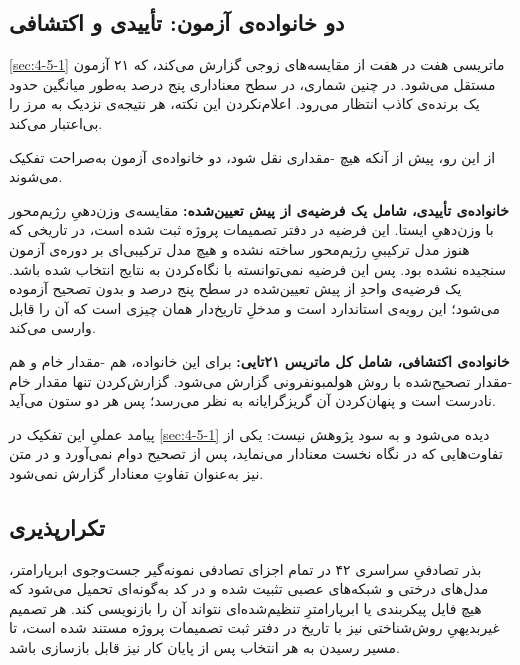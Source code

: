 \subsection*{دو خانواده‌ی آزمون: تأییدی و اکتشافی}

\cref{sec:4-5-1} ماتریسی هفت در هفت از مقایسه‌های زوجی گزارش می‌کند، که ۲۱ آزمون مستقل
می‌شود. در چنین شماری، در سطح معناداری پنج درصد به‌طور میانگین حدود یک برنده‌ی کاذب
انتظار می‌رود. اعلام‌نکردن این نکته، هر نتیجه‌ی نزدیک به مرز را بی‌اعتبار می‌کند.

از این رو، پیش از آنکه هیچ -مقداری نقل شود، دو خانواده‌ی آزمون به‌صراحت تفکیک
می‌شوند.

\textbf{خانواده‌ی تأییدی، شامل یک فرضیه‌ی از پیش تعیین‌شده:} مقایسه‌ی وزن‌دهیِ رژیم‌محور
با وزن‌دهیِ ایستا. این فرضیه در دفتر تصمیمات پروژه ثبت شده است، در تاریخی که هنوز
مدل ترکیبیِ رژیم‌محور ساخته نشده و هیچ مدل ترکیبی‌ای بر دوره‌ی آزمون سنجیده نشده بود.
پس این فرضیه نمی‌توانسته با نگاه‌کردن به نتایج انتخاب شده باشد. یک فرضیه‌ی واحدِ از
پیش تعیین‌شده در سطح پنج درصد و بدون تصحیح آزموده می‌شود؛ این رویه‌ی استاندارد است و
مدخلِ تاریخ‌دار همان چیزی است که آن را قابل وارسی می‌کند.

\textbf{خانواده‌ی اکتشافی، شامل کل ماتریس ۲۱تایی:} برای این خانواده، هم
-مقدار خام و هم -مقدار تصحیح‌شده با روش هولمبونفرونی گزارش می‌شود.
گزارش‌کردن تنها مقدار خام نادرست است و پنهان‌کردن آن گریزگرایانه به نظر می‌رسد؛ پس
هر دو ستون می‌آید.

پیامد عملیِ این تفکیک در \cref{sec:4-5-1} دیده می‌شود و به سود پژوهش نیست: یکی از
تفاوت‌هایی که در نگاه نخست معنادار می‌نماید، پس از تصحیح دوام نمی‌آورد و در متن نیز
به‌عنوان تفاوتِ معنادار گزارش نمی‌شود.

\subsection*{تکرارپذیری}

بذر تصادفیِ سراسری ۴۲ در تمام اجزای تصادفی  نمونه‌گیر جست‌وجوی ابرپارامتر،
مدل‌های درختی و شبکه‌های عصبی  تثبیت شده و در کد به‌گونه‌ای تحمیل می‌شود که
هیچ فایل پیکربندی یا ابرپارامترِ تنظیم‌شده‌ای نتواند آن را بازنویسی کند. هر تصمیم
غیربدیهیِ روش‌شناختی نیز با تاریخ در دفتر ثبت تصمیمات پروژه مستند شده است، تا مسیر
رسیدن به هر انتخاب پس از پایان کار نیز قابل بازسازی باشد.
